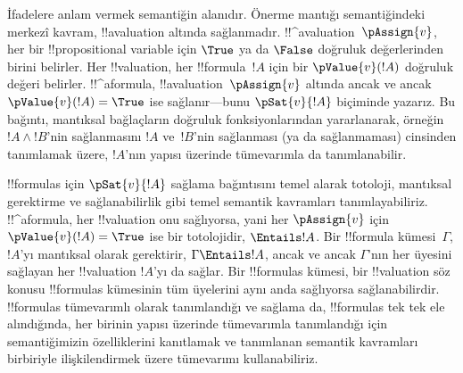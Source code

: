 \documentclass[../../../include/open-logic-section]{subfiles}
\begin{document}
İfadelere anlam vermek semantiğin alanıdır. Önerme mantığı semantiğindeki
merkezî kavram, !!a{valuation} altında sağlanmadır. !!^a{valuation}~$\pAssign{v}$,
her bir !!{propositional variable} için $\True$ ya da $\False$ doğruluk
değerlerinden birini belirler.
Her !!{valuation}, her !!{formula}~$!A$ için bir $\pValue{v}(!A)$ doğruluk
değeri belirler. !!^a{formula}, !!a{valuation}~$\pAssign{v}$ altında ancak ve
ancak $\pValue{v}(!A) = \True$ ise sağlanır---bunu $\pSat{v}{!A}$ biçiminde
yazarız. Bu bağıntı, mantıksal bağlaçların doğruluk fonksiyonlarından
yararlanarak, örneğin $!A \land !B$'nin sağlanmasını $!A$ ve~$!B$'nin
sağlanması (ya da sağlanmaması) cinsinden tanımlamak üzere, $!A$'nın yapısı
üzerinde tümevarımla da tanımlanabilir.

!!{formula}s için $\pSat{v}{!A}$ sağlama bağıntısını temel alarak totoloji,
mantıksal gerektirme ve
sağlanabilirlik gibi temel semantik kavramları tanımlayabiliriz.
!!^a{formula}, her !!{valuation} onu sağlıyorsa, yani her $\pAssign{v}$ için
$\pValue{v}(!A) = \True$ ise bir totolojidir, $\Entails !A$. Bir
!!{formula} kümesi~$\Gamma$, $!A$'yı mantıksal olarak gerektirir,
$\Gamma \Entails !A$, ancak ve ancak $\Gamma$'nın her üyesini sağlayan her
!!{valuation} $!A$'yı da sağlar. Bir
!!{formula}s kümesi, bir !!{valuation} söz konusu !!{formula}s kümesinin
tüm üyelerini aynı anda sağlıyorsa sağlanabilirdir. !!{formula}s tümevarımlı
olarak tanımlandığı ve sağlama da, !!{formula}s tek tek ele alındığında,
her birinin yapısı üzerinde tümevarımla
tanımlandığı için semantiğimizin özelliklerini kanıtlamak ve tanımlanan
semantik kavramları birbiriyle ilişkilendirmek üzere tümevarımı
kullanabiliriz.
\end{document}
